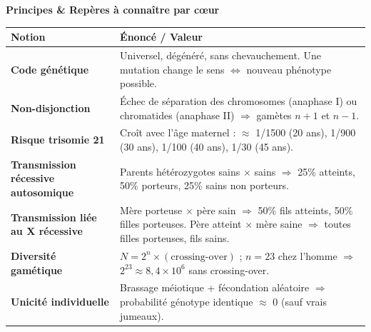 \documentclass[11pt]{article}
\begin{document}
\begin{aretenir}
\textbf{Principes \& Repères à connaître par cœur}\par
\begin{center}
\begin{tabularx}{\linewidth}{|>{\bfseries}l|X|}\hline
\rowcolor{popgreenL} \textbf{Notion} & \textbf{Énoncé / Valeur} \\\hline
Code génétique & Universel, dégénéré, sans chevauchement. Une mutation change le sens $\Leftrightarrow$ nouveau phénotype possible. \\\hline
Non-disjonction & Échec de séparation des chromosomes (anaphase I) ou chromatides (anaphase II) $\Rightarrow$ gamètes $n+1$ et $n-1$. \\\hline
Risque trisomie 21 & Croît avec l'âge maternel : $\approx$ 1/1500 (20 ans), 1/900 (30 ans), 1/100 (40 ans), 1/30 (45 ans). \\\hline
Transmission récessive autosomique & Parents hétérozygotes sains $\times$ sains $\Rightarrow$ 25\% atteints, 50\% porteurs, 25\% sains non porteurs. \\\hline
Transmission liée au X récessive & Mère porteuse $\times$ père sain $\Rightarrow$ 50\% fils atteints, 50\% filles porteuses. Père atteint $\times$ mère saine $\Rightarrow$ toutes filles porteuses, fils sains. \\\hline
Diversité gamétique & $N = 2^n \times (\text{crossing-over})$ ; $n=23$ chez l'homme $\Rightarrow$ $2^{23} \approx 8,4 \times 10^6$ sans crossing-over. \\\hline
Unicité individuelle & Brassage méiotique + fécondation aléatoire $\Rightarrow$ probabilité génotype identique $\approx$ 0 (sauf vrais jumeaux). \\\hline
\end{tabularx}
\end{center}


\end{aretenir}
\end{document}
